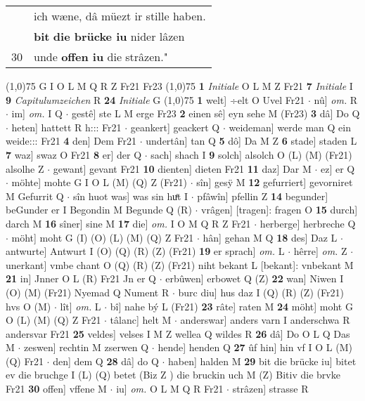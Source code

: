 \documentclass[8pt,a4paper,notitlepage]{article}
\begin{document}
\begin{table}[ht]
\begin{minipage}[t]{0.5\linewidth}
\begin{tabular}{rl}
 & ich wæne, dâ müezt ir stille haben.\\ 
 & \textbf{bit} \textbf{die brücke iu} nider lâzen\\ 
30 & unde \textbf{offen iu} die strâzen."\\ 
\end{tabular}
\scriptsize
\line(1,0){75} \newline
G I O L M Q R Z Fr21 Fr23 \newline
\line(1,0){75} \newline
\textbf{1} \textit{Initiale} O L M Z Fr21  \textbf{7} \textit{Initiale} I  \textbf{9} \textit{Capitulumzeichen} R  \textbf{24} \textit{Initiale} G  \newline
\line(1,0){75} \newline
\textbf{1} welt] ÷elt O Uvel Fr21  $\cdot$ nû] \textit{om.} R  $\cdot$ im] \textit{om.} I Q  $\cdot$ gestê] ste L M erge Fr23 \textbf{2} einen sê] eyn sehe M (Fr23) \textbf{3} dâ] Do Q  $\cdot$ heten] hattett R h::: Fr21  $\cdot$ geankert] geackert Q  $\cdot$ weideman] werde man Q ein weide::: Fr21 \textbf{4} den] Dem Fr21  $\cdot$ undertân] tan Q \textbf{5} dô] Da M Z \textbf{6} stade] staden L \textbf{7} waz] swaz O Fr21 \textbf{8} er] der Q  $\cdot$ sach] shach I \textbf{9} solch] alsolch O (L) (M) (Fr21) alsolhe Z  $\cdot$ gewant] gevant Fr21 \textbf{10} dienten] dieten Fr21 \textbf{11} daz] Dar M  $\cdot$ ez] er Q  $\cdot$ möhte] mohte G I O L (M) (Q) Z (Fr21)  $\cdot$ sîn] gesÿ M \textbf{12} gefurriert] gevorniret M Gefurrit Q  $\cdot$ sîn huot was] was sin huͤt I  $\cdot$ pfâwîn] pfellin Z \textbf{14} begunder] beGunder er I Begondin M Begunde Q (R)  $\cdot$ vrâgen] [tragen]: fragen O \textbf{15} durch] darch M \textbf{16} sîner] sine M \textbf{17} die] \textit{om.} I O M Q R Z Fr21  $\cdot$ herberge] herbreche Q  $\cdot$ möht] moht G (I) (O) (L) (M) (Q) Z Fr21  $\cdot$ hân] gehan M Q \textbf{18} des] Daz L  $\cdot$ antwurte] Antwurt I (O) (Q) (R) (Z) (Fr21) \textbf{19} er sprach] \textit{om.} L  $\cdot$ hêrre] \textit{om.} Z  $\cdot$ unerkant] vmbe chant O (Q) (R) (Z) (Fr21) niht bekant L [bekant]: vnbekant M \textbf{21} in] Jnner O L (R) Fr21 Jn er Q  $\cdot$ erbûwen] erbowet Q (Z) \textbf{22} wan] Niwen I (O) (M) (Fr21) Nyemad Q Nument R  $\cdot$ burc diu] hus daz I (Q) (R) (Z) (Fr21) hvs O (M)  $\cdot$ lît] \textit{om.} L  $\cdot$ bî] nahe bý L (Fr21) \textbf{23} râte] raten M \textbf{24} möht] moht G O (L) (M) (Q) Z Fr21  $\cdot$ tâlanc] helt M  $\cdot$ anderswar] anders varn I anderschwa R andersvar Fr21 \textbf{25} veldes] velses I M Z wellea Q wildes R \textbf{26} dâ] Do O L Q Das M  $\cdot$ zeswen] rechtin M zserwen Q  $\cdot$ hende] henden Q \textbf{27} ûf hin] hin vf I O L (M) (Q) Fr21  $\cdot$ den] dem Q \textbf{28} dâ] do Q  $\cdot$ haben] halden M \textbf{29} bit die brücke iu] bitet ev die bruchge I (L) (Q) betet (Biz Z ) die bruckin uch M (Z) Bitiv die brvke Fr21 \textbf{30} offen] vffene M  $\cdot$ iu] \textit{om.} O L M Q R Fr21  $\cdot$ strâzen] strasse R \newline

\end{minipage}
\end{table}
\end{document}
